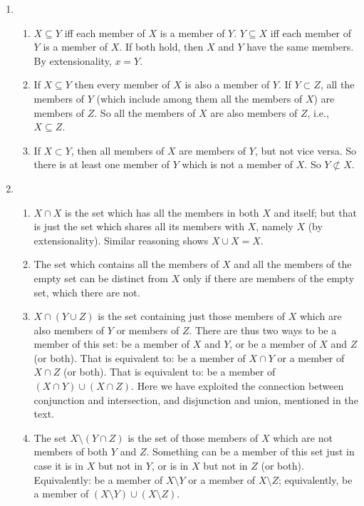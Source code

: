 {\begin{enumerate}
	\item \begin{enumerate}
		\item $X\subseteq Y$ iff each member of $X$ is a member of $Y$. $Y \subseteq X$ iff each member of $Y$ is a member of $X$. If both hold, then $X$ and $Y$ have the same members. By extensionality, $x=Y$.  
		\item If $X\subseteq Y$ then every member of $X$ is also a member of $Y$. If $Y \subset Z$, all the members of $Y$ (which include among them all the members of $X$) are members of $Z$. So all the members of $X$ are also members of $Z$, i.e., $X\subseteq Z$. \setcounter{enumii}{3}
		\item If $X \subset Y$, then all members of $X$ are members of $Y$, but not vice versa. So there is at least one member of $Y$ which is not a member of $X$. So $Y\not\subset X$. 
	\end{enumerate}
	\item \begin{enumerate}
		\item $X\cap X$ is the set which has all the members in both $X$ and itself; but that is just the set which shares all its members with $X$, namely $X$ (by extensionality). Similar reasoning shows $X\cup X = X$. \setcounter{enumii}{2}
	\item The set which contains all the members of $X$ and all the members of the empty set can be distinct from $X$ only if there are members of the empty set, which there are not. \setcounter{enumii}{4}
	\item $X\cap(Y \cup Z)$ is the set containing just those members of $X$ which are also members of $Y$ or members of $Z$. There are thus two ways to be a member of this set: be a member of $X$ and  $Y$, or be a member of $X$ and $Z$ (or both). That is equivalent to: be a member of $X \cap Y$ or a member of $X \cap Z$ (or both). That is equivalent to: be a member of $(X\cap Y)\cup(X\cap Z)$. Here we have exploited the connection between conjunction and intersection, and disjunction and union, mentioned in the text. \setcounter{enumii}{6}
	\item The set $X \setminus (Y \cap Z)$ is the set of those members of $X$ which are not members of both $Y$ and $Z$. Something can be a member of this set just in case it is in $X$ but not in $Y$, or is in $X$ but not in $Z$ (or both). Equivalently: be a member of $X \setminus Y$ or a member of $X\setminus Z$; equivalently, be a member of $(X \setminus Y) \cup (X\setminus Z)$.

\end{enumerate}
\end{enumerate}}
